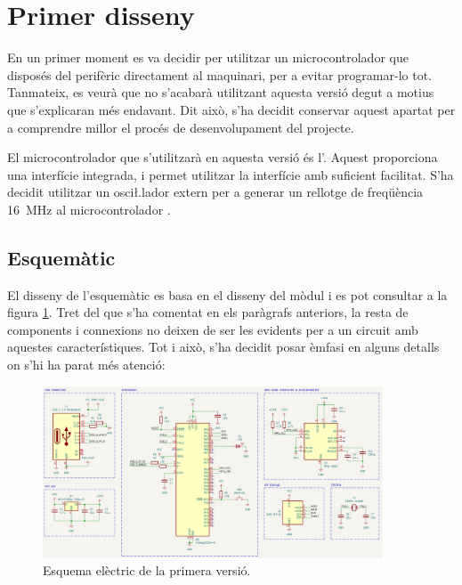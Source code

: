 \section{Primer disseny}

En un primer moment es va decidir per utilitzar un microcontrolador que disposés
del perifèric  directament al maquinari, per a evitar programar-lo tot.
Tanmateix, es veurà que no s'acabarà utilitzant aquesta versió degut a motius
que s'explicaran més endavant. Dit això, s'ha decidit conservar aquest apartat
per a comprendre millor el procés de desenvolupament del projecte.

El microcontrolador que s'utilitzarà en aquesta versió és l'.
Aquest proporciona una interfície  integrada, i permet utilitzar la
interfície  amb suficient facilitat. S'ha decidit utilitzar un
osci\l.lador extern per a generar un rellotge de freqüència
\SI[round-mode=places,round-precision=0]{16}{\mega\hertz}
al microcontrolador \cite{AtMega32u4}.

\subsection{Esquemàtic}

El disseny de l'esquemàtic es basa en el disseny del mòdul  i es pot
consultar a la figura \ref{fig:sch_v1}. Tret del que s'ha comentat en els paràgrafs
anteriors, la resta de components i connexions no deixen de ser les evidents per
a un circuit amb aquestes característiques. Tot i això, s'ha decidit posar
èmfasi en alguns detalls on s'hi ha parat més atenció:

\begin{figure}[ht]
    \centering
    \includegraphics[width=0.9\textwidth]{images/kicad/gyro1_sch.png}
    \caption{Esquema elèctric de la primera versió.}
    \label{fig:sch_v1}
\end{figure}

